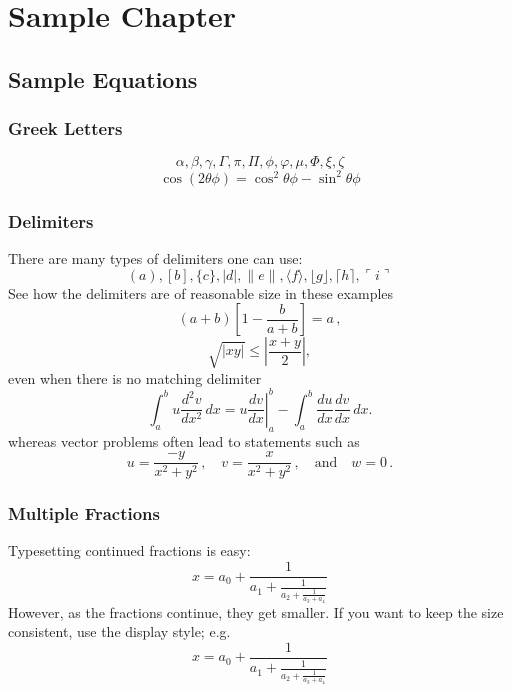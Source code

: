 \chapter{Sample Chapter}
\lipsum[4]

\section{Sample Equations}
\lipsum[4] 

\subsection{Greek Letters}
\[ \alpha,  \beta,  \gamma, \Gamma, \pi, \Pi, \phi, \varphi, \mu, \Phi, \xi, \zeta \]
\[ \cos(2\theta\phi) = \cos^2 \theta\phi - \sin^2 \theta\phi \]
\subsection{Delimiters}
There are many types of delimiters one can use:
\[ ( a ), [ b ], \{ c \}, | d |, \| e \|,
\langle f \rangle, \lfloor g \rfloor,
\lceil h \rceil, \ulcorner i \urcorner \]
See how the delimiters are of reasonable size in these examples
\[
        \left(a+b\right)\left[1-\frac{b}{a+b}\right]=a\,,
\]
\[
        \sqrt{|xy|}\leq\left|\frac{x+y}{2}\right|,
\]
even when there is no matching delimiter
\[
        \int_a^bu\frac{d^2v}{dx^2}\,dx
        =\left.u\frac{dv}{dx}\right|_a^b
        -\int_a^b\frac{du}{dx}\frac{dv}{dx}\,dx.
\]
whereas vector problems often lead to statements such as
\[
        u=\frac{-y}{x^2+y^2}\,,\quad
        v=\frac{x}{x^2+y^2}\,,\quad\text{and}\quad
        w=0\,.
\]
\subsection{Multiple Fractions}
Typesetting continued fractions is easy:
\[
x = a_0 + \frac{1}{a_1 + \frac{1}{a_2 + \frac{1}{a_3 + a_4}}}
\]
However, as the fractions continue, they get smaller. If you want to keep the size consistent, use the display style; e.g.
\[
  x = a_0 + \frac{1}{\displaystyle a_1
          + \frac{1}{\displaystyle a_2
          + \frac{1}{\displaystyle a_3 + a_4}}}
\]
